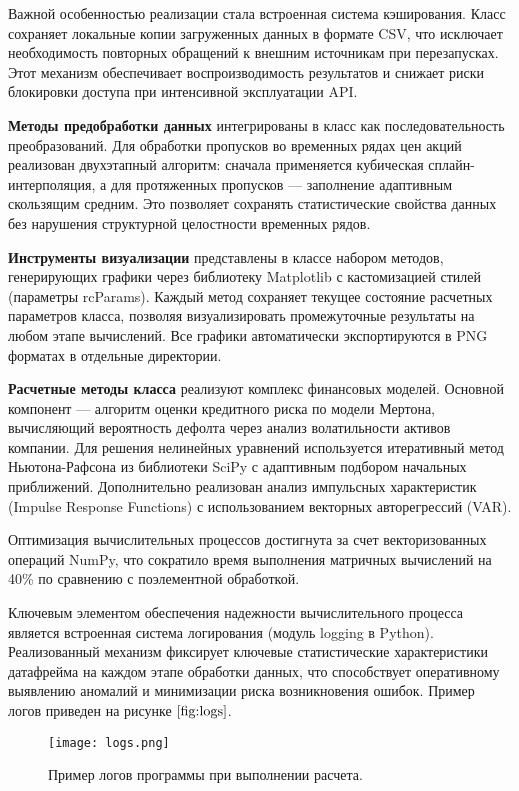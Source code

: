 \documentclass[]{article}
\begin{document}
	Важной особенностью реализации стала встроенная система кэширования. Класс сохраняет локальные копии загруженных данных в формате CSV, что исключает необходимость повторных обращений к внешним источникам при перезапусках. Этот механизм обеспечивает воспроизводимость результатов и снижает риски блокировки доступа при интенсивной эксплуатации API.
	
	\textbf{Методы предобработки данных} интегрированы в класс как последовательность преобразований. Для обработки пропусков во временных рядах цен акций реализован двухэтапный алгоритм: сначала применяется кубическая сплайн-интерполяция, а для протяженных пропусков — заполнение адаптивным скользящим средним. Это позволяет сохранять статистические свойства данных без нарушения структурной целостности временных рядов.
	
	\textbf{Инструменты визуализации} представлены в классе набором методов, генерирующих графики через библиотеку Matplotlib с кастомизацией стилей (параметры rcParams). Каждый метод сохраняет текущее состояние расчетных параметров класса, позволяя визуализировать промежуточные результаты на любом этапе вычислений. Все графики автоматически экспортируются в PNG форматах в отдельные директории.
	
	\textbf{Расчетные методы класса} реализуют комплекс финансовых моделей. Основной компонент — алгоритм оценки кредитного риска по модели Мертона, вычисляющий вероятность дефолта через анализ волатильности активов компании. Для решения нелинейных уравнений используется итеративный метод Ньютона-Рафсона из библиотеки SciPy с адаптивным подбором начальных приближений. Дополнительно реализован анализ импульсных характеристик (Impulse Response Functions) с использованием векторных авторегрессий (VAR).
	
	Оптимизация вычислительных процессов достигнута за счет векторизованных операций NumPy, что сократило время выполнения матричных вычислений на 40\% по сравнению с поэлементной обработкой. 
	
	Ключевым элементом обеспечения надежности вычислительного процесса является встроенная система логирования (модуль logging в Python). Реализованный механизм фиксирует ключевые статистические характеристики датафрейма на каждом этапе обработки данных, что способствует оперативному выявлению аномалий и минимизации риска возникновения ошибок.
	Пример логов приведен на рисунке $\ref{fig:logs}$.
	
	\begin{figure}[ht] %
		\centering %
		\texttt{[image: logs.png]} %
		\caption{Пример логов программы при выполнении расчета.} %
		\label{fig:logs} %
	\end{figure}
	
\end{document}
